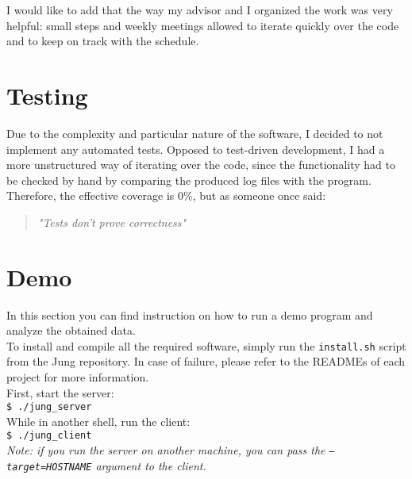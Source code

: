     I would like to add that the way my advisor and I organized the work was very helpful: small
    steps and weekly meetings allowed to iterate quickly over the code and to keep on track
    with the schedule.


    \section{Testing}

        Due to the complexity and particular nature of the software, I decided to not implement any automated
        tests. Opposed to test-driven development, I had a more unstructured way of iterating over the code,
        since the functionality had to be checked by hand by comparing the produced log files with the program.
        Therefore, the effective coverage is 0\%, but as someone once said:\\

        \begin{quote} 
            \centering 
            \textit{"Tests don't prove correctness"}
        \end{quote}


    \section{Demo}

        In this section you can find instruction on how to run a demo program and analyze the obtained data.\\

        To install and compile all the required software, simply run the \texttt{install.sh} script from the Jung repository.
        In case of failure, please refer to the READMEs of each project for more information.\\

        First, start the server:\\

        \texttt{\$ ./jung\_server}\\
        
        While in another shell, run the client:\\
        
        \texttt{\$ ./jung\_client}\\

        \textit{Note: if you run the server on another machine, you can pass the \texttt{---target=HOSTNAME}
        argument to the client.}\\

